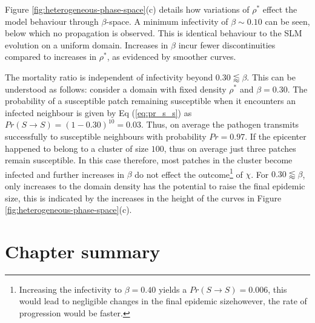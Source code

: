 Figure \ref{fig:heterogeneous-phase-space}(c) details how variations of $\rho^*$ effect the model behaviour through $\beta$-space. %
A minimum infectivity of $\beta\sim0.10$ can be seen, below which no propagation is observed. %
This is identical behaviour to the SLM evolution on a uniform domain. %
Increases in $\beta$ incur fewer discontinuities compared to increases in $\rho^*$, as evidenced by smoother curves. %

The mortality ratio is independent of infectivity beyond $0.30 \lessapprox \beta$. %
This can be understood as follows: consider a domain with fixed density $\rho^*$ and $\beta=0.30$. %
The probability of a susceptible patch remaining susceptible when it encounters an infected neighbour is given by Eq (\ref{eq:pr_s_s}) as $Pr(S \rightarrow S) = (1 - 0.30)^{10} = 0.03$. %
Thus, on average the pathogen transmits successfully to susceptible neighbours with probability $Pr=0.97$. %
If the epicenter happened to belong to a cluster of size $100$, thus on average just three patches remain susceptible. %
In this case therefore, most patches in the cluster become infected and further increases in $\beta$ do not effect the %
outcome\footnote{Increasing the infectivity to $\beta=0.40$ yields a $Pr(S \rightarrow S) = 0.006$, this would lead to negligible changes in the final epidemic size\textemdash however, the rate of progression would be faster.} of $\chi$. %
For $0.30 \lessapprox  \beta$, only increases to the domain density has the potential to raise the final epidemic size, %
this is indicated by the increases in the height of the curves in Figure \ref{fig:heterogeneous-phase-space}(c). %


\section{Chapter summary}


